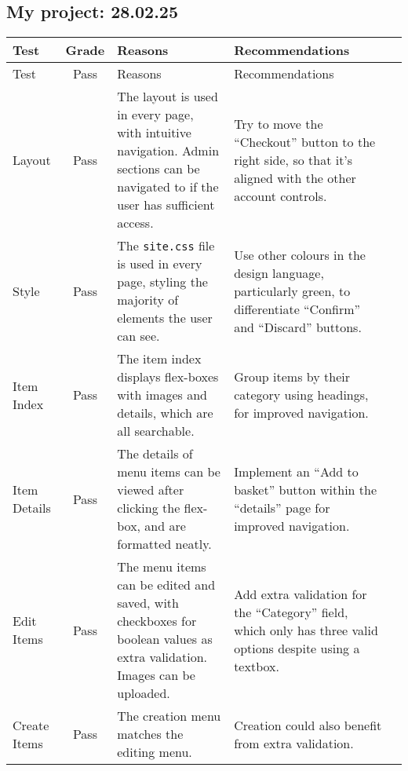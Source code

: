 \documentclass{article}
\begin{document}
  \subsection{My project: 28.02.25}
  \begin{adjustwidth}{-2cm}{-2cm}
  \begin{center} %
    \begin{longtable}{|p{1.2cm}|c|p{5cm}|p{5cm}|c|}
      \hline Test & Grade & Reasons & Recommendations \\ \hline 
      \endfirsthead
      
      \hline Test & Pass & Reasons & Recommendations \\ \hline 
      \endhead

      Layout & Pass & 
      The layout is used in every page, with intuitive navigation. Admin sections can be navigated to if the user has sufficient access. &
      Try to move the ``Checkout'' button to the right side, so that it's aligned with the other account controls. \\ \hline

      Style & Pass & 
      The \texttt{site.css} file is used in every page, styling the majority of elements the user can see. &
      Use other colours in the design language, particularly green, to differentiate ``Confirm'' and ``Discard'' buttons. \\ \hline
      
      Item Index & Pass &
      The item index displays flex-boxes with images and details, which are all searchable. &
      Group items by their category using headings, for improved navigation. \\ \hline

      Item Details & Pass &
      The details of menu items can be viewed after clicking the flex-box, and are formatted neatly. &
      Implement an ``Add to basket'' button within the ``details'' page for improved navigation.\\ \hline

      Edit Items & Pass &
      The menu items can be edited and saved, with checkboxes for boolean values as extra validation. Images can be uploaded. &
      Add extra validation for the ``Category'' field, which only has three valid options despite using a textbox. \\ \hline

      Create Items & Pass &
      The creation menu matches the editing menu. &
      Creation could also benefit from extra validation. \\ \hline


\end{longtable}
\end{center}
\end{adjustwidth}
\end{document}
